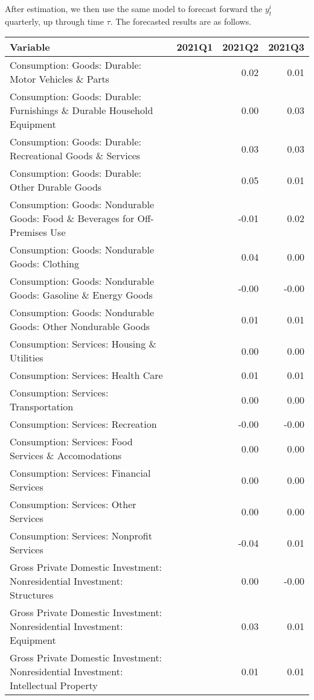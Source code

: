\documentclass[11pt, letterpaper]{article}\usepackage[]{graphicx}\usepackage[]{color}
\begin{document}
After estimation, we then use the same model to forecast forward the $y^i_t$ quarterly, up through time $\tau$. 
The forecasted results are as follows.
\begin{table}[H]
\centering
\begingroup\scriptsize
\begin{tabular}{lrrr}
  \hline
Variable & 2021Q1 & 2021Q2 & 2021Q3 \\ 
  \hline
Consumption: Goods: Durable: Motor Vehicles \& Parts &  & 0.02 & 0.01 \\ 
  Consumption: Goods: Durable: Furnishings \& Durable Household Equipment &  & 0.00 & 0.03 \\ 
  Consumption: Goods: Durable: Recreational Goods \& Services &  & 0.03 & 0.03 \\ 
  Consumption: Goods: Durable: Other Durable Goods &  & 0.05 & 0.01 \\ 
  Consumption: Goods: Nondurable Goods: Food \& Beverages for Off-Premises Use &  & -0.01 & 0.02 \\ 
  Consumption: Goods: Nondurable Goods: Clothing &  & 0.04 & 0.00 \\ 
  Consumption: Goods: Nondurable Goods: Gasoline \& Energy Goods &  & -0.00 & -0.00 \\ 
  Consumption: Goods: Nondurable Goods: Other Nondurable Goods &  & 0.01 & 0.01 \\ 
  Consumption: Services: Housing \& Utilities &  & 0.00 & 0.00 \\ 
  Consumption: Services: Health Care &  & 0.01 & 0.01 \\ 
  Consumption: Services: Transportation &  & 0.00 & 0.00 \\ 
  Consumption: Services: Recreation &  & -0.00 & -0.00 \\ 
  Consumption: Services: Food Services \& Accomodations &  & 0.00 & 0.00 \\ 
  Consumption: Services: Financial Services &  & 0.00 & 0.00 \\ 
  Consumption: Services: Other Services &  & 0.00 & 0.00 \\ 
  Consumption: Services: Nonprofit Services &  & -0.04 & 0.01 \\ 
  Gross Private Domestic Investment: Nonresidential Investment: Structures &  & 0.00 & -0.00 \\ 
  Gross Private Domestic Investment: Nonresidential Investment: Equipment &  & 0.03 & 0.01 \\ 
  Gross Private Domestic Investment: Nonresidential Investment: Intellectual Property &  & 0.01 & 0.01 \\ 

\end{tabular}
\end{table}
\end{document}
